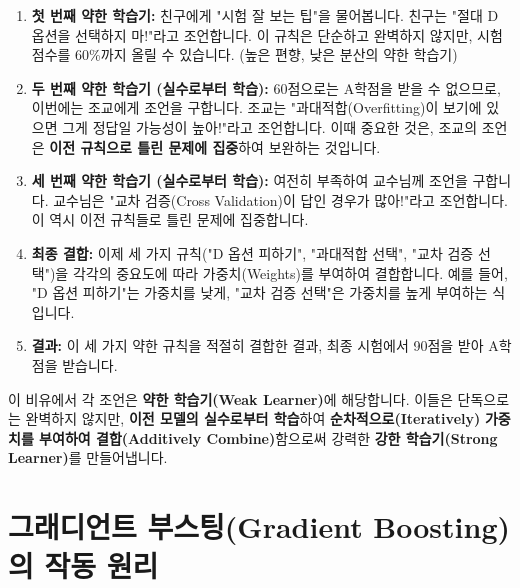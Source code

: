 \documentclass[11pt,a4paper]{book}
\theoremstyle{definition}
\begin{document}
\begin{tcolorbox}[example, title={시험 통과 비유}] %
\begin{enumerate}
    \item \textbf{첫 번째 약한 학습기:} 친구에게 "시험 잘 보는 팁"을 물어봅니다. 친구는 "절대 D 옵션을 선택하지 마!"라고 조언합니다. 이 규칙은 단순하고 완벽하지 않지만, 시험 점수를 60\%까지 올릴 수 있습니다. (높은 편향, 낮은 분산의 약한 학습기)
    \item \textbf{두 번째 약한 학습기 (실수로부터 학습):} 60점으로는 A학점을 받을 수 없으므로, 이번에는 조교에게 조언을 구합니다. 조교는 "과대적합(Overfitting)이 보기에 있으면 그게 정답일 가능성이 높아!"라고 조언합니다. 이때 중요한 것은, 조교의 조언은 \textbf{이전 규칙으로 틀린 문제에 집중}하여 보완하는 것입니다.
    \item \textbf{세 번째 약한 학습기 (실수로부터 학습):} 여전히 부족하여 교수님께 조언을 구합니다. 교수님은 "교차 검증(Cross Validation)이 답인 경우가 많아!"라고 조언합니다. 이 역시 이전 규칙들로 틀린 문제에 집중합니다.
    \item \textbf{최종 결합:} 이제 세 가지 규칙("D 옵션 피하기", "과대적합 선택", "교차 검증 선택")을 각각의 중요도에 따라 가중치(Weights)를 부여하여 결합합니다. 예를 들어, "D 옵션 피하기"는 가중치를 낮게, "교차 검증 선택"은 가중치를 높게 부여하는 식입니다.
    \item \textbf{결과:} 이 세 가지 약한 규칙을 적절히 결합한 결과, 최종 시험에서 90점을 받아 A학점을 받습니다.
\end{enumerate}
\end{tcolorbox}

이 비유에서 각 조언은 \textbf{약한 학습기(Weak Learner)}에 해당합니다. 이들은 단독으로는 완벽하지 않지만, \textbf{이전 모델의 실수로부터 학습}하여 \textbf{순차적으로(Iteratively)} \textbf{가중치를 부여하여 결합(Additively Combine)}함으로써 강력한 \textbf{강한 학습기(Strong Learner)}를 만들어냅니다.


\section{그래디언트 부스팅(Gradient Boosting)의 작동 원리}
\end{document}
